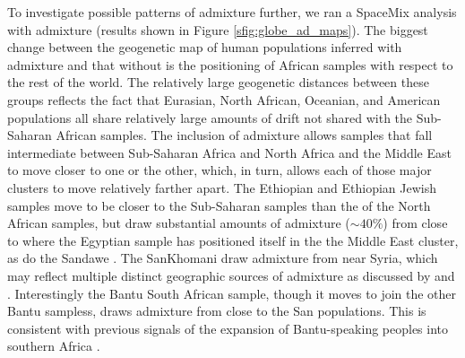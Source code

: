 \documentclass[12pt]{article}
\newcommand{\plr}[1]{{\it\color{purple}{(#1)}}}
\begin{document}

To investigate possible patterns of admixture further, we ran a SpaceMix analysis with admixture (results shown in Figure \ref{sfig:globe_ad_maps}). The biggest change between the geogenetic map of human populations inferred with admixture and that without is the positioning of African samples with respect to the rest of the world.  The relatively large geogenetic distances between these groups reflects the fact that Eurasian, North African, Oceanian, and American populations all share relatively large amounts of drift not shared with the Sub-Saharan African samples. The inclusion of admixture allows samples that fall intermediate between Sub-Saharan Africa and North Africa and the Middle East to move closer to one or the other, which, in turn, allows each of those major clusters to move relatively farther apart.  The Ethiopian and Ethiopian Jewish samples move to be closer to the Sub-Saharan samples than the of the North African samples, but draw substantial amounts of admixture ($\sim 40\%$) from close to where the Egyptian sample has positioned itself in the the Middle East cluster, as do the Sandawe \citep{hodgson_early_2014,Pickrell:12}. The SanKhomani draw admixture from near Syria, which may reflect multiple distinct geographic sources of admixture as discussed by \citep{Hellenthal} and \citep{Pickrell:14}. 
Interestingly the Bantu South African sample, though it moves to join the other Bantu sampless, draws admixture from close to the San populations. This is consistent with previous signals of the expansion of Bantu-speaking peoples into southern Africa  \citep{Pickrell:12,Jakobsson_genomic_2012,Pickrell:14,Hellenthal}. 
\end{document}
